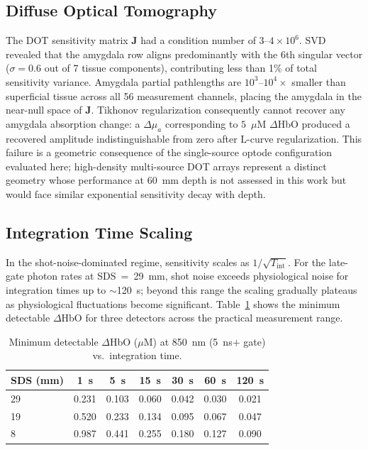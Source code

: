 \documentclass[11pt,a4paper]{article}
\begin{document}
\subsection{Diffuse Optical Tomography}

The DOT sensitivity matrix $\mathbf{J}$ had a condition number of $3$--$4\times10^6$. SVD revealed that the amygdala row aligns predominantly with the 6th singular vector ($\sigma = 0.6$ out of 7 tissue components), contributing less than 1\% of total sensitivity variance. Amygdala partial pathlengths are $10^3$--$10^4\times$ smaller than superficial tissue across all 56 measurement channels, placing the amygdala in the near-null space of $\mathbf{J}$. Tikhonov regularization consequently cannot recover any amygdala absorption change: a $\Delta\mu_a$ corresponding to $5$~$\mu$M $\Delta$HbO produced a recovered amplitude indistinguishable from zero after L-curve regularization. This failure is a geometric consequence of the single-source optode configuration evaluated here; high-density multi-source DOT arrays represent a distinct geometry whose performance at 60~mm depth is not assessed in this work but would face similar exponential sensitivity decay with depth\cite{boas2001imaging,dehghani2009depth}.

\subsection{Integration Time Scaling}

In the shot-noise-dominated regime, sensitivity scales as $1/\sqrt{T_\mathrm{int}}$. For the late-gate photon rates at SDS~=~29~mm, shot noise exceeds physiological noise for integration times up to $\sim$120~s; beyond this range the scaling gradually plateaus as physiological fluctuations become significant. Table~\ref{tab:int_time} shows the minimum detectable $\Delta$HbO for three detectors across the practical measurement range.

\begin{table}[H]
\centering
\caption{Minimum detectable $\Delta$HbO ($\mu$M) at 850~nm (5~ns$+$ gate) vs.\ integration time.}
\label{tab:int_time}
\small
\begin{tabular}{lcccccc}
\toprule
SDS (mm) & 1~s & 5~s & 15~s & 30~s & 60~s & 120~s \\
\midrule
29 & 0.231 & 0.103 & 0.060 & 0.042 & 0.030 & 0.021 \\
19 & 0.520 & 0.233 & 0.134 & 0.095 & 0.067 & 0.047 \\
8  & 0.987 & 0.441 & 0.255 & 0.180 & 0.127 & 0.090 \\
\bottomrule
\end{tabular}
\end{table}
\end{document}
